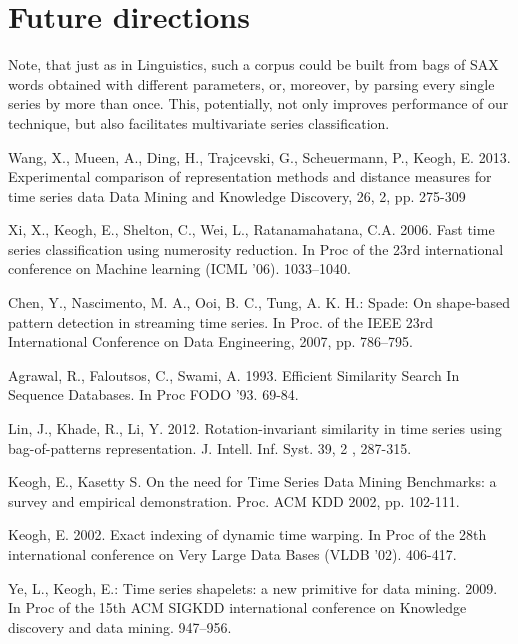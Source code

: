 \documentclass{llncs}
\begin{document}
\section{Future directions}
Note, that just as in Linguistics, such a corpus could be built from bags of SAX words obtained with
different parameters, or, moreover, by parsing every single series by more than once. This,
potentially, not only improves performance of our technique, but also facilitates multivariate
series classification.

%
%
\begin{thebibliography}{5}


Wang, X., Mueen, A., Ding, H., Trajcevski, G., Scheuermann, P., Keogh, E. 2013.
Experimental comparison of representation methods and distance measures for time series data
Data Mining and Knowledge Discovery, 26, 2, pp. 275-309

Xi, X., Keogh, E., Shelton, C., Wei, L., Ratanamahatana, C.A. 2006. 
Fast time series classification using numerosity reduction. 
In Proc of the 23rd international conference on Machine learning (ICML '06). 1033--1040.

Chen, Y., Nascimento, M. A., Ooi, B. C., Tung, A. K. H.:
Spade: On shape-based pattern detection in streaming time series. 
In Proc. of the IEEE 23rd International Conference on Data Engineering, 2007, pp. 786–795.

Agrawal, R., Faloutsos, C., Swami, A. 1993.
Efficient Similarity Search In Sequence Databases.
In Proc FODO '93. 69-84.

Lin, J., Khade, R., Li, Y. 2012.
Rotation-invariant similarity in time series using bag-of-patterns representation. 
J. Intell. Inf. Syst. 39, 2 , 287-315.

Keogh, E., Kasetty S. 
On the need for Time Series Data Mining Benchmarks: a survey and empirical demonstration.
Proc. ACM KDD 2002, pp. 102-111.

Keogh, E. 2002. 
Exact indexing of dynamic time warping. 
In Proc of the 28th international conference on Very Large Data Bases (VLDB '02). 406-417.

Ye, L., Keogh, E.:
Time series shapelets: a new primitive for data mining. 2009.
In Proc of the 15th ACM SIGKDD international conference on Knowledge discovery and data
mining. 947--956.


\end{thebibliography}
\end{document}
